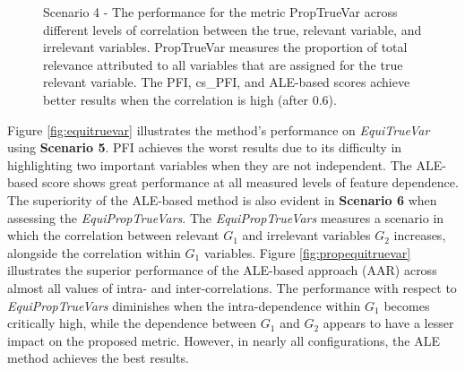 \begin{figure}[ht!]
\centering
  \caption{Scenario 4 - The performance for the metric PropTrueVar across different levels of correlation between the true, relevant variable, and irrelevant variables. PropTrueVar measures the proportion of total relevance attributed to all variables that are assigned for the true relevant variable. The PFI, cs\_PFI, and ALE-based scores achieve better results when the correlation is high (after 0.6).}
    \label{fig:propTrueVar}
\end{figure}

Figure \ref{fig:equitruevar} illustrates the method's performance on \textit{EquiTrueVar} using \textbf{Scenario 5}. PFI achieves the worst results due to its difficulty in highlighting two important variables when they are not independent. The ALE-based score shows great performance at all measured levels of feature dependence. The superiority of the ALE-based method is also evident in \textbf{Scenario 6} when assessing the \textit{EquiPropTrueVars}. The \textit{EquiPropTrueVars} measures a scenario in which the correlation between relevant \(G_1\) and irrelevant variables \(G_2\) increases, alongside the correlation within \(G_1\) variables. Figure \ref{fig:propequitruevar} illustrates the superior performance of the ALE-based approach (AAR) across almost all values of intra- and inter-correlations. The performance with respect to \textit{EquiPropTrueVars} diminishes when the intra-dependence within \(G_1\) becomes critically high, while the dependence between \(G_1\) and \(G_2\) appears to have a lesser impact on the proposed metric. However, in nearly all configurations, the ALE method achieves the best results.

